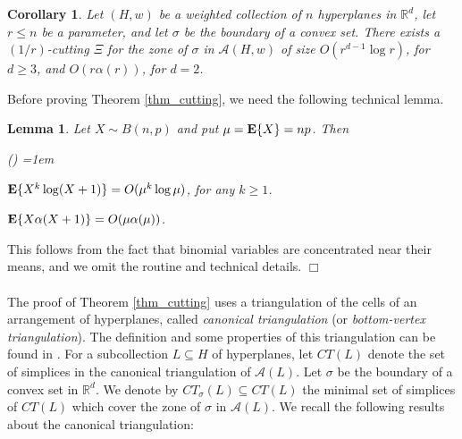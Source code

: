 \documentclass[11pt]{article}
\newtheorem{lemma}[theorem]{Lemma}
\newtheorem{corollary}[theorem]{Corollary}
\newcounter{itemcounter}
\def\reals{\mathbb R}
\begin{document}
\begin{corollary} \label{corollary_weight_cutting}
Let $(H,w)$ be a weighted collection of $n$ hyperplanes in $\reals^{d}$, let $r \leq n$ be a parameter, and let $\sigma$ be the boundary of a convex set. There exists a $(1/r)$-cutting $\Xi$ for the zone of $\sigma$ in $\mathcal{A}(H,w)$ of size $O(r^{d-1}\log r)$, for $d \geq 3$, and $O(r \alpha(r))$, for $d = 2$.
\end{corollary}

Before proving Theorem \ref{thm_cutting}, we need the following technical lemma.
\begin{lemma} \label{lemma_func_expectation}
Let $X \sim B(n,p)$ and put $\mu = {\bf E}\{X\} = np$. Then
\begin{list} {\emph{()}}{ \leftmargin=1em}
\item ${\bf E}\{X^{k}\log(X+1)\} = O(\mu^{k}\log \mu)$, for any $k \geq 1$.
\item ${\bf E}\{X \alpha(X+1)\} = O(\mu \alpha(\mu))$.
\end{list}
\end{lemma}
 This follows from the fact that binomial variables are concentrated near their means, and we omit the routine and technical details. $\Box$

\paragraph{}
The proof of Theorem \ref{thm_cutting} uses a triangulation of the cells of an arrangement of hyperplanes, called \emph{canonical triangulation} (or \emph{bottom-vertex triangulation}). The definition and some properties of this triangulation can be found in \cite{mat02}. For a subcollection $L \subseteq H$ of hyperplanes, let $CT(L)$ denote the set of simplices in the canonical triangulation of $\mathcal{A}(L)$. Let $\sigma$ be the boundary of a convex set in $\reals^{d}$. We denote by $CT_{\sigma}(L) \subseteq CT(L)$ the minimal set of simplices of $CT(L)$ which cover the zone of $\sigma$ in $\mathcal{A}(L)$. We recall the following results about the canonical triangulation:
\end{document}
